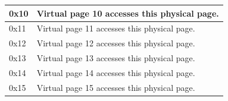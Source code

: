 \begin{table}[H]
\begin{tabular}[t]{|p{1cm}|p{7cm}|}
        \hline
        0x10 & Virtual page 10 accesses this physical page. \\
        \hline
        0x11 & Virtual page 11 accesses this physical page. \\
        \hline
        0x12 & Virtual page 12 accesses this physical page. \\
        \hline
        0x13 & Virtual page 13 accesses this physical page. \\
        \hline
        0x14 & Virtual page 14 accesses this physical page. \\
        \hline
        0x15 & Virtual page 15 accesses this physical page. \\
        \hline
    \end{tabular}
\end{table}
